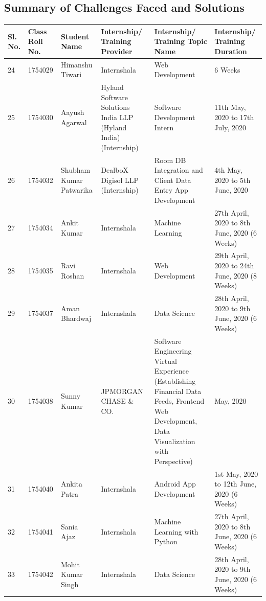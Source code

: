 \documentclass[11pt,a4paper]{article}
\newenvironment{card}{
    \begin{tcolorbox}[
        enhanced,
        colback=cardback,
        colframe=border,
        sharp corners,
        boxrule=0.5pt,
        drop shadow,
        shadow xshift=1mm,
        shadow yshift=-1mm,
        shadow color=border!50,
        boxsep=3mm,
        left=5mm, right=5mm, top=5mm, bottom=5mm,
        width=\textwidth,
        nobeforeafter
    ]
}{\end{tcolorbox}}
\begin{document}
\begin{card}
    \subsection*{\textcolor{accent}{Summary of Challenges Faced and Solutions}}
    \vspace{0.3cm}
    \begin{longtable}{@{}p{}p{}p{}p{}p{}p{}@{}}
        \toprule
        \textbf{Sl. No.} & \textbf{Class Roll No.} & \textbf{Student Name} & \textbf{Internship/ Training Provider} & \textbf{Internship/ Training Topic Name} & \textbf{Internship/ Training Duration} \\
        \midrule
        \endhead
        24 & 1754029 & Himanshu Tiwari & Internshala & Web Development & 6 Weeks \\
        25 & 1754030 & Aayush Agarwal & Hyland Software Solutions India LLP (Hyland India) (Internship) & Software Development Intern & 11th May, 2020 to 17th July, 2020 \\
        26 & 1754032 & Shubham Kumar Patwarika & DealboX Digisol LLP (Internship) & Room DB Integration and Client Data Entry App Development & 4th May, 2020 to 5th June, 2020 \\
        27 & 1754034 & Ankit Kumar & Internshala & Machine Learning & 27th April, 2020 to 8th June, 2020 (6 Weeks) \\
        28 & 1754035 & Ravi Roshan & Internshala & Web Development & 29th April, 2020 to 24th June, 2020 (8 Weeks) \\
        29 & 1754037 & Aman Bhardwaj & Internshala & Data Science & 28th April, 2020 to 9th June, 2020 (6 Weeks) \\
        30 & 1754038 & Sunny Kumar & JPMORGAN CHASE \& CO. & Software Engineering Virtual Experience (Establishing Financial Data Feeds, Frontend Web Development, Data Visualization with Perspective) & May, 2020 \\
        31 & 1754040 & Ankita Patra & Internshala & Android App Development & 1st May, 2020 to 12th June, 2020 (6 Weeks) \\
        32 & 1754041 & Sania Ajaz & Internshala & Machine Learning with Python & 27th April, 2020 to 8th June, 2020 (6 Weeks) \\
        33 & 1754042 & Mohit Kumar Singh & Internshala & Data Science & 28th April, 2020 to 9th June, 2020 (6 Weeks) \\
        \bottomrule
    \end{longtable}
\end{card}
\end{document}
